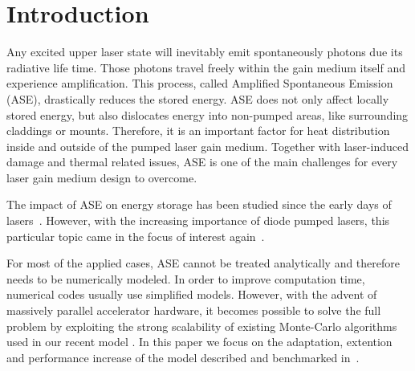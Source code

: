 \section{Introduction}
Any excited upper laser state will inevitably emit spontaneously
photons due its radiative life time. Those photons travel freely
within the gain medium itself and experience amplification.  This
process, called Amplified Spontaneous Emission (ASE), drastically
reduces the stored energy. ASE does not only affect locally stored
energy, but also dislocates energy into non-pumped areas, like
surrounding claddings or mounts. Therefore, it is an important factor
for heat distribution inside and outside of the pumped laser gain
medium. Together with laser-induced damage and thermal related issues,
ASE is one of the main challenges for every laser gain medium design
to overcome.

The impact of ASE on energy storage has been studied since the early
days of lasers~\cite{Intro1,Intro2,Intro3}. However, with the
increasing importance of diode pumped lasers, this particular topic
came in the focus of interest again~\cite{Intro4}.

For most of the applied cases, ASE cannot be treated analytically and
therefore needs to be numerically modeled. In order to improve
computation time, numerical codes usually use simplified
models. However, with the advent of massively parallel accelerator
hardware, it becomes possible to solve the full problem by exploiting
the strong scalability of existing Monte-Carlo algorithms used in our
recent model \cite{Intro4}. In this paper we focus on the
adaptation, extention and performance increase of the model described
and benchmarked in~\cite{Intro4}.
